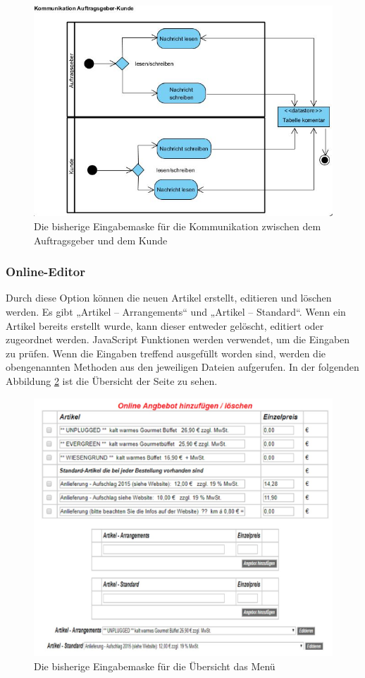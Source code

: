 \begin{figure}[h]
	\centering
	\includegraphics[width=0.7\linewidth]{Graphics/Kommunikation.JPG}
	\caption[Kundeansicht]{Die bisherige Eingabemaske für die Kommunikation zwischen dem Auftragsgeber und dem Kunde}
	\label{fig:Kommunikation Auftraggeber Kunde}
\end{figure}

\subsubsection{Online-Editor}

Durch diese Option können die neuen Artikel erstellt, editieren und löschen werden. Es gibt „Artikel – Arrangements“ und „Artikel – Standard“. Wenn ein Artikel bereits erstellt wurde, kann dieser entweder gelöscht, editiert oder zugeordnet werden. 
JavaScript Funktionen werden verwendet, um die Eingaben zu prüfen. Wenn die Eingaben treffend ausgefüllt worden sind, werden die obengenannten Methoden aus den jeweiligen Dateien aufgerufen. In der folgenden Abbildung \ref{fig: Online-EditorUebersicht} ist die Übersicht der Seite zu sehen.
\pagebreak

\begin{figure}[h]
	\centering
	\includegraphics[width=0.7\linewidth]{Graphics/menue-uebesicht.png}
	\caption[Kundeansicht]{Die bisherige Eingabemaske für die Übersicht das Menü}
	\label{fig: Online-EditorUebersicht}
\end{figure}

